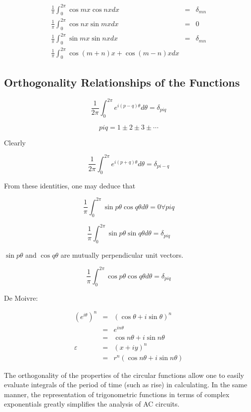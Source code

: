 \documentclass[a4paper,12pt]{article}
\begin{document}
\begin{eqnarray*}
	\frac{1}{\pi} \int^{2 \pi}_{0} \cos{mx}\cos{nx}dx & = & \delta_{mn} \\
	\frac{1}{\pi} \int^{2 \pi}_{0} \cos{nx}\sin{mx}dx & = & 0 \\
	\frac{1}{\pi} \int^{2 \pi}_{0} \sin{mx}\sin{nx}dx & = & \delta_{mn} \\
	\frac{1}{\pi} \int^{2 \pi}_{0} \cos{(m + n)x} + \cos{(m - n)x}dx & &
\end{eqnarray*}


\subsection{Orthogonality Relationships of the Functions}

\[ \frac{1}{2 \pi} \int^{2 \pi}_{0} e^{i(p - q)\theta} d\theta =
\delta_{piq} \]

\[ piq = 1 \pm 2 \pm 3 \pm \cdots \]

Clearly

\[	\frac{1}{2 \pi} \int^{2 \pi}_{0} e^{i(p + q)\theta} d \theta =
\delta_{pi - q} \]

From these identities, one may deduce that

\[ \frac{1}{\pi} \int^{2 \pi}_{0} \sin{p \theta}\cos{q \theta}d\theta =
0 \forall piq \]

\[ \frac{1}{\pi} \int^{2 \pi}_{0} \sin{p \theta} \sin{q \theta}d \theta
= \delta_{piq} \]

$\sin{p \theta}$ and $\cos{q \theta}$ are mutually
perpendicular unit vectors.

\[ \frac{1}{\pi} \int^{2 \pi}_{0} \cos{p \theta} \cos{q \theta} d \theta
= \delta_{piq} \]

De Moivre:

\begin{eqnarray*}
	(e^{i \theta})^{n} & = & (\cos{\theta} + i\sin{\theta})^{n} \\
							 & = & e^{in \theta} \\
							 & = & \cos{n \theta} + i\sin{n \theta} \\
			\varepsilon  & = & (x + iy)^{n} \\
							 & = & r^{n}(\cos{n \theta} + i\sin{n \theta}) 
\end{eqnarray*}
							 

The orthogonality of the properties of the circular functions
allow one to easily evaluate integrals of the period of time (such as
rise) in calculating. In the same manner, the representation of
trigonometric functions in terms of complex exponentials greatly
simplifies the analysis of AC circuits.
\end{document}
